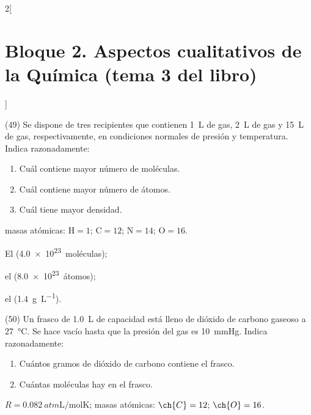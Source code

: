 \documentclass[10pt]{article}
\newenvironment{gexdatos}{
      \noindent\makebox[0pt][r]{\textit{Datos:}}
    }{\vspace{5pt}}
\begin{document}
\begin{multicols}{2}[
    \section{Bloque 2. Aspectos cualitativos de la Química (tema 3 del libro)}
  ]
\begin{exercise}[
    tags    = {},
    topics  = {química,química básica},
    source  = {FQ 1B MGH 2016, p86, e49},
  ]
  (49) Se dispone de tres recipientes que contienen \SI{1}{\liter} de  gas, \SI{2}{\liter} de  gas y \SI{15}{\liter} de  gas, respectivamente, en condiciones normales de presión y temperatura. Indica razonadamente:

  \begin{enumerate}
    \item Cuál contiene mayor número de moléculas.
    \item Cuál contiene mayor número de átomos.
    \item Cuál tiene mayor densidad.
  \end{enumerate}

  \begin{gexdatos}
    masas atómicas: \( \textrm{H} = 1 \); \( \textrm{C} = 12 \); \( \textrm{N} = 14 \); \( \textrm{O} = 16 \).
  \end{gexdatos}
\end{exercise}

\begin{solution}
  \begin{enumerate*}
    \item El  (\SI{4.0e23}{moléculas});
    \item el  (\SI{8.0e23}{átomos});
    \item el  (\SI{1.4}{\gram\per\liter}).
  \end{enumerate*}
\end{solution}





\begin{exercise}[
    tags    = {},
    topics  = {química,química básica},
    source  = {FQ 1B MGH 2016, p86, e50},
  ]
  (50) Un frasco de \SI{1.0}{\liter} de capacidad está lleno de dióxido de carbono gaseoso a \SI{27}{\celsius}. Se hace vacío hasta que la presión del
  gas es \SI{10}{\mmHg}. Indica razonadamente:

  \begin{enumerate}
    \item Cuántos gramos de dióxido de carbono contiene el frasco.
    \item Cuántas moléculas hay en el frasco.
  \end{enumerate}

  \begin{gexdatos}
    \( R = \SI{0.082}{atm\liter\per\mole\kelvin} \); masas atómicas: \( \ch{C} = 12 \); \( \ch{O} = 16 \).
  \end{gexdatos}
\end{exercise}


\end{multicols}
\end{document}
